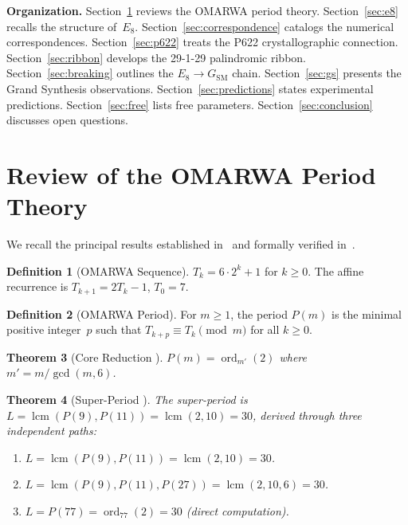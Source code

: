 \documentclass[11pt, a4paper]{article}
\theoremstyle{plain}
\newtheorem{theorem}{Theorem}[section]
\theoremstyle{definition}
\newtheorem{definition}[theorem]{Definition}
\theoremstyle{remark}
\newcommand{\ord}{\operatorname{ord}}
\DeclareMathOperator{\lcm}{lcm}
\begin{document}
\medskip
\noindent\textbf{Organization.}
Section~\ref{sec:review} reviews the OMARWA period theory.
Section~\ref{sec:e8} recalls the structure of~$E_8$.
Section~\ref{sec:correspondence} catalogs the numerical correspondences.
Section~\ref{sec:p622} treats the P622 crystallographic connection.
Section~\ref{sec:ribbon} develops the 29-1-29 palindromic ribbon.
Section~\ref{sec:breaking} outlines the $E_8 \to G_{\mathrm{SM}}$ chain.
Section~\ref{sec:gs} presents the Grand Synthesis observations.
Section~\ref{sec:predictions} states experimental predictions.
Section~\ref{sec:free} lists free parameters.
Section~\ref{sec:conclusion} discusses open questions.

\section{Review of the OMARWA Period Theory}
\label{sec:review}

We recall the principal results established in~\cite{paket2} and
formally verified in~\cite{paket1}.

\begin{definition}[OMARWA Sequence]
$T_k = 6 \cdot 2^k + 1$ for $k \geq 0$.
The affine recurrence is $T_{k+1} = 2T_k - 1$, $T_0 = 7$.
\end{definition}

\begin{definition}[OMARWA Period]
For $m \geq 1$, the period $P(m)$ is the minimal positive integer~$p$
such that $T_{k+p} \equiv T_k \pmod{m}$ for all $k \geq 0$.
\end{definition}

\begin{theorem}[Core Reduction {\cite[Thm.~3.1]{paket2}}]
\label{thm:core}
$P(m) = \ord_{m'}(2)$ where $m' = m / \gcd(m, 6)$.
\end{theorem}

\begin{theorem}[Super-Period {\cite[Thms.~3.9--3.11]{paket2}}]
\label{thm:super}
The super-period is $L = \lcm(P(9), P(11)) = \lcm(2, 10) = 30$,
derived through three independent paths:
\begin{enumerate}
  \item $L = \lcm(P(9), P(11)) = \lcm(2, 10) = 30$.
  \item $L = \lcm(P(9), P(11), P(27)) = \lcm(2, 10, 6) = 30$.
  \item $L = P(77) = \ord_{77}(2) = 30$ (direct computation).
\end{enumerate}
\end{theorem}
\end{document}

